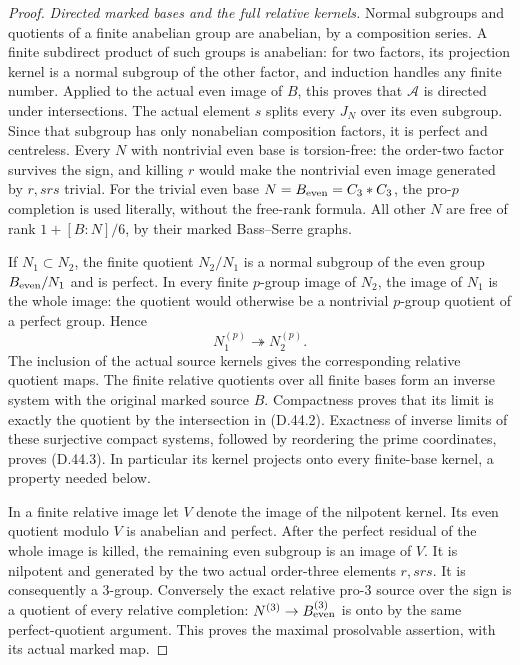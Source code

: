 \begin{proof}
\emph{Directed marked bases and the full relative kernels.}
Normal subgroups and quotients of a finite anabelian group are
anabelian, by a composition series. A finite subdirect product
of such groups is anabelian: for two factors, its projection
kernel is a normal subgroup of the other factor, and induction
handles any finite number. Applied to the actual even image
of \(B\), this proves that \(\mathscr A\) is directed under
intersections. The actual element \(s\) splits every \(J_N\)
over its even subgroup. Since that subgroup has only nonabelian
composition factors, it is perfect and centreless.
Every \(N\) with nontrivial even base is torsion-free: the order-two factor survives
the sign, and killing \(r\) would make the nontrivial even
image generated by \(r,srs\) trivial. For the trivial even
base \(N=B_{\rm even}=C_3*C_3\), the pro-\(p\) completion
is used literally, without the free-rank formula. All other
\(N\) are free of rank \(1+[B:N]/6\), by their marked
Bass--Serre graphs.

If \(N_1\subset N_2\), the finite quotient \(N_2/N_1\)
is a normal subgroup of the even group \(B_{\rm even}/N_1\)
and is perfect. In every finite \(p\)-group image of \(N_2\),
the image of \(N_1\) is the whole image: the quotient would
otherwise be a nontrivial \(p\)-group quotient of a perfect
group. Hence
\[
                    N_1^{(p)}\twoheadrightarrow N_2^{(p)}.    \tag{D.44.9}
\]
The inclusion of the actual source kernels gives the
corresponding relative quotient maps. The finite relative
quotients over all finite bases form an inverse system with
the original marked source \(B\). Compactness proves that
its limit is exactly the quotient by the intersection in
(D.44.2). Exactness of inverse limits of these surjective
compact systems, followed by reordering the prime
coordinates, proves (D.44.3). In particular its kernel
projects onto every finite-base kernel, a property needed
below.

In a finite relative image let \(V\) denote the image of
the nilpotent kernel. Its even quotient modulo \(V\) is
anabelian and perfect. After the perfect residual of the
whole image is killed, the remaining even subgroup is an
image of \(V\). It is nilpotent and generated by the two
actual order-three elements \(r,srs\). It is consequently
a \(3\)-group. Conversely the exact relative pro-\(3\)
source over the sign is a quotient of every relative
completion: \(N^{(3)}\to B_{\rm even}^{(3)}\) is onto by
the same perfect-quotient argument. This proves the
maximal prosolvable assertion, with its actual marked map.


\end{proof}
